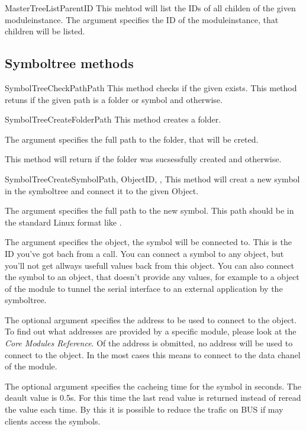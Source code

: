 \begin{methoddesc}[Core]{MasterTreeList}{ParentID}
This mehtod will list the IDs of all childen of the given moduleinstance. The argument  specifies the 
ID of the moduleinstance, that children will be listed. 
\end{methoddesc}


\subsection{Symboltree methods}
\begin{methoddesc}[Core]{SymbolTreeCheckPath}{Path}
This method checks if the given  exists. This method retuns   if the given path is a folder or symbol
and  otherwise.
\end{methoddesc}


\begin{methoddesc}[Core]{SymbolTreeCreateFolder}{Path}
This method creates a folder. 

The argument  specifies the full path to the folder, that will be creted. 

This method will return  if the folder was sucsessfully created and 
 otherwise.
\end{methoddesc}


\begin{methoddesc}[Core]{SymbolTreeCreateSymbol}{Path, ObjectID, , }
This method will creat a new symbol in the symboltree and connect it to the 
given Object.

The argument  specifies the full path to the new symbol. This path 
should be in the standard Linux format like .

The argument  specifies the object, the symbol will be connected
to. This is the ID you've got bach from a  call. You can 
connect a symbol to any object, but you'll not get allways usefull values back 
from this object. You can also connect the symbol to an object, that doesn't provide
any values, for example to a object of the  module to tunnel the
serial interface to an external application by the symboltree.

The optional argument  specifies the address to be used to connect
to the object. To find out what addresses are provided by a specific module,
please look at the \textit{Core Modules Reference}. Of the address is obmitted,
no address will be used to connect to the object. In the most cases this means
to connect to the data chanel of the module. 

The optional argument  specifies the cacheing time for the symbol in
seconds. The deault value is 0.5s.
For this time the last read value is returned instead of reread the value each 
time. By this it is possible to reduce the trafic on BUS if may clients access 
the symbols.
\end{methoddesc}


